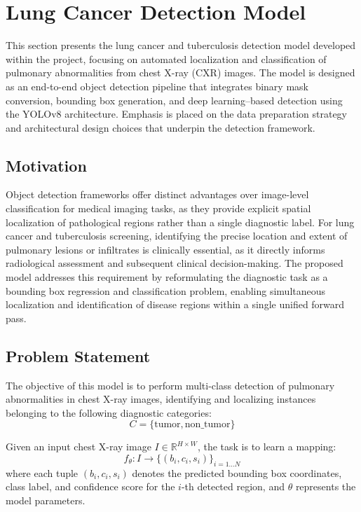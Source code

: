 \section{Lung Cancer Detection Model}
This section presents the lung cancer and tuberculosis detection model developed within the project, focusing on automated localization and classification of pulmonary abnormalities from chest X-ray (CXR) images. The model is designed as an end-to-end object detection pipeline that integrates binary mask conversion, bounding box generation, and deep learning–based detection using the YOLOv8 architecture. Emphasis is placed on the data preparation strategy and architectural design choices that underpin the detection framework.

\subsection{Motivation}
Object detection frameworks offer distinct advantages over image-level classification for medical imaging tasks, as they provide explicit spatial localization of pathological regions rather than a single diagnostic label. For lung cancer and tuberculosis screening, identifying the precise location and extent of pulmonary lesions or infiltrates is clinically essential, as it directly informs radiological assessment and subsequent clinical decision-making. The proposed model addresses this requirement by reformulating the diagnostic task as a bounding box regression and classification problem, enabling simultaneous localization and identification of disease regions within a single unified forward pass.

\subsection{Problem Statement}
The objective of this model is to perform multi-class detection of pulmonary abnormalities in chest X-ray images, identifying and localizing instances belonging to the following diagnostic categories:
\begin{equation}
	C = \{\text{tumor}, \text{non\_tumor}\}
\end{equation}

Given an input chest X-ray image $I \in \mathbb{R}^{H \times W}$, the task is to learn a mapping:
\begin{equation}
	f_\theta : I \rightarrow \{(b_i, c_i, s_i)\}_{i=1 \dots N}
\end{equation}
where each tuple $(b_i, c_i, s_i)$ denotes the predicted bounding box coordinates, class label, and confidence score for the $i$-th detected region, and $\theta$ represents the model parameters.

